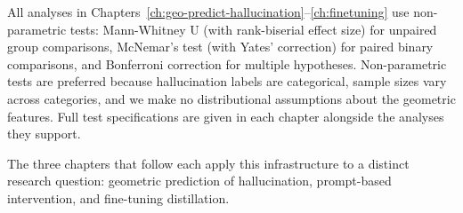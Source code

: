 All analyses in Chapters~\ref{ch:geo-predict-hallucination}--\ref{ch:finetuning} use non-parametric tests: Mann-Whitney U (with rank-biserial effect size) for unpaired group comparisons, McNemar's test (with Yates' correction) for paired binary comparisons, and Bonferroni correction for multiple hypotheses. Non-parametric tests are preferred because hallucination labels are categorical, sample sizes vary across categories, and we make no distributional assumptions about the geometric features. Full test specifications are given in each chapter alongside the analyses they support.

The three chapters that follow each apply this infrastructure to a distinct research question: geometric prediction of hallucination, prompt-based intervention, and fine-tuning distillation.
